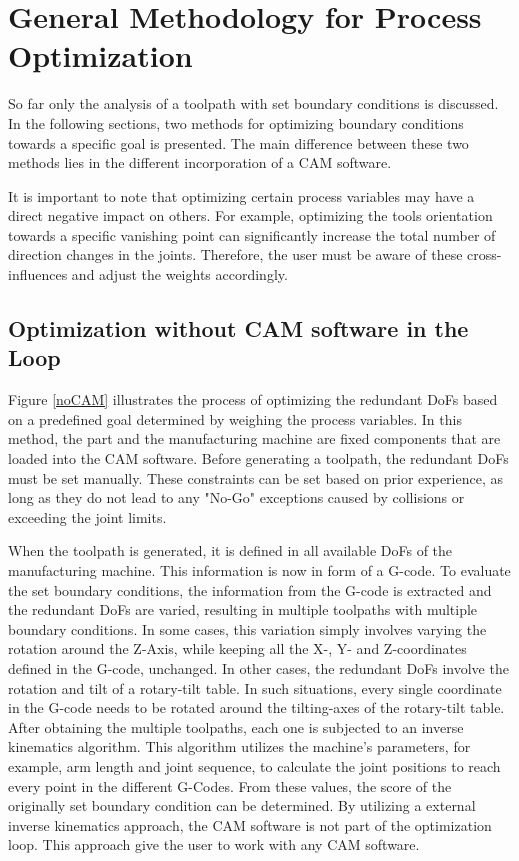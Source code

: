 \newpage
\section{General Methodology for Process Optimization}
So far only the analysis of a toolpath with set boundary conditions is discussed. In the following sections, two methods for optimizing boundary conditions towards a specific goal is presented. The main difference between these two methods lies in the different incorporation of a \acrshort{CAM} software.

It is important to note that optimizing certain process variables may have a direct negative impact on others. For example, optimizing the tools orientation towards a specific vanishing point can significantly increase the total number of direction changes in the joints. Therefore, the user must be aware of these cross-influences and adjust the weights accordingly.

\subsection{Optimization without CAM software in the Loop}\label{noCAMchap}

Figure \ref{noCAM} illustrates the process of optimizing the redundant \acrshort{DoF}s based on a predefined goal determined by weighing the process variables. In this method, the part and the manufacturing machine are fixed components that are loaded into the \acrshort{CAM} software. Before generating a toolpath, the redundant \acrshort{DoF}s must be set manually. These constraints can be set based on prior experience, as long as they do not lead to any "No-Go" exceptions caused by collisions or exceeding the joint limits.

When the toolpath is generated, it is defined in all available \acrshort{DoF}s of the manufacturing machine. This information is now in form of a G-code. To evaluate the set boundary conditions, the information from the G-code is extracted and the redundant \acrshort{DoF}s are varied, resulting in multiple toolpaths with multiple boundary conditions. In some cases, this variation simply involves varying the rotation around the Z-Axis, while keeping all the X-, Y- and Z-coordinates defined in the G-code, unchanged. In other cases, the redundant \acrshort{DoF}s involve the rotation and tilt of a rotary-tilt table. In such situations, every single coordinate in the G-code needs to be rotated around the tilting-axes of the rotary-tilt table. After obtaining the multiple toolpaths, each one is subjected to an inverse kinematics algorithm. This algorithm utilizes the machine's parameters, for example, arm length and joint sequence, to calculate the joint positions to reach every point in the different G-Codes. From these values, the score of the originally set boundary condition can be determined. By utilizing a external inverse kinematics approach, the \acrshort{CAM} software is not part of the optimization loop. This approach give  the user to work with any \acrshort{CAM} software.  

